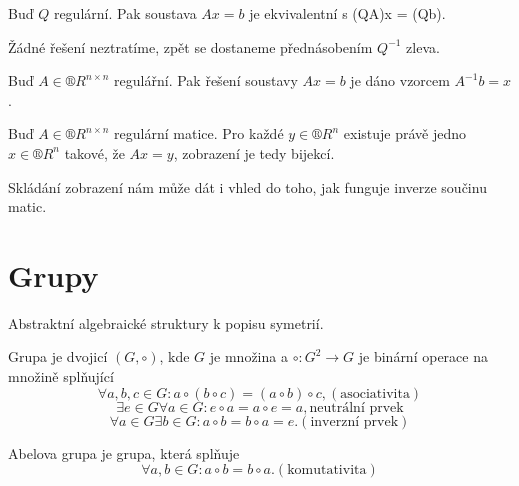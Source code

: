 \documentclass[12pt]{article}					%
\begin{document}
    \begin{poznamka}
        Buď $Q$ regulární. Pak soustava $Ax = b$ je ekvivalentní s (QA)x = (Qb).
        \begin{dukazin}
            Žádné řešení neztratíme, zpět se dostaneme přednásobením $Q^{-1}$ zleva.
        \end{dukazin}
    \end{poznamka}

    \begin{veta}
        Buď $A\in ®R^{n\times n}$ regulářní. Pak řešení soustavy $Ax = b$ je dáno vzorcem $A^{-1}b = x$.
    \end{veta}

    \begin{poznamka}
        Buď $A \in ®R^{n\times n}$ regulární matice. Pro každé $y \in ®R^n$ existuje právě jedno $x \in ®R^n$ takové, že $Ax = y$, zobrazení je tedy bijekcí.
    \end{poznamka}

    \begin{poznamka}
        Skládání zobrazení nám může dát i vhled do toho, jak funguje inverze součinu matic.
    \end{poznamka}


\section{Grupy}
    Abstraktní algebraické struktury k popisu symetrií.

    \begin{definice}[Grupa]
        Grupa je dvojicí $(G, \circ)$, kde $G$ je množina a $\circ : G^2 \rightarrow G$ je binární operace na množině splňující
        $$ \forall a, b, c \in G: a\circ(b\circ c) = (a\circ b) \circ c, (\text{asociativita}) $$ 
        $$ \exists e \in G \forall a \in G: e\circ a = a \circ e = a, \text{neutrální prvek} $$ 
        $$ \forall a \in G \exists b \in G: a \circ b = b \circ a = e. (\text{inverzní prvek}) $$ 
    \end{definice}

    \begin{definice}
        Abelova grupa je grupa, která splňuje
        $$ \forall a, b \in G: a\circ b = b\circ a.   (\text{komutativita}) $$ 
    \end{definice}
\end{document}
